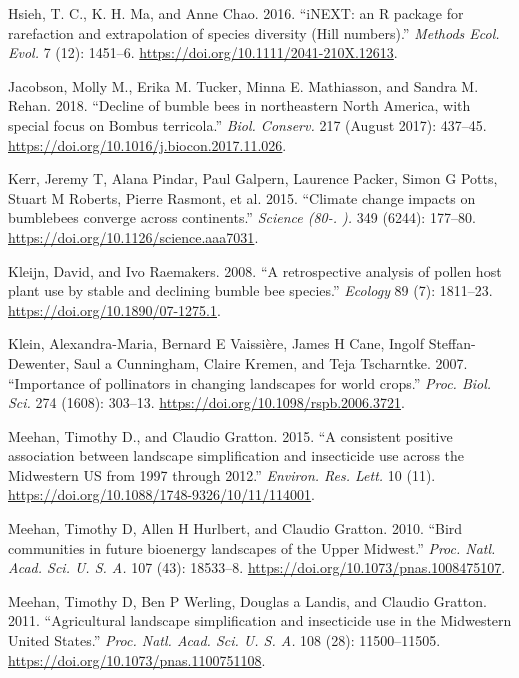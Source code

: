 \documentclass[11pt,]{article}
\begin{document}
\leavevmode\hypertarget{ref-Hsieh2016}{}%
Hsieh, T. C., K. H. Ma, and Anne Chao. 2016. ``iNEXT: an R package for
rarefaction and extrapolation of species diversity (Hill numbers).''
\emph{Methods Ecol. Evol.} 7 (12): 1451--6.
\url{https://doi.org/10.1111/2041-210X.12613}.

\leavevmode\hypertarget{ref-Jacobson2018a}{}%
Jacobson, Molly M., Erika M. Tucker, Minna E. Mathiasson, and Sandra M.
Rehan. 2018. ``Decline of bumble bees in northeastern North America,
with special focus on Bombus terricola.'' \emph{Biol. Conserv.} 217
(August 2017): 437--45.
\url{https://doi.org/10.1016/j.biocon.2017.11.026}.

\leavevmode\hypertarget{ref-Kerr2015}{}%
Kerr, Jeremy T, Alana Pindar, Paul Galpern, Laurence Packer, Simon G
Potts, Stuart M Roberts, Pierre Rasmont, et al. 2015. ``Climate change
impacts on bumblebees converge across continents.'' \emph{Science (80-.
).} 349 (6244): 177--80. \url{https://doi.org/10.1126/science.aaa7031}.

\leavevmode\hypertarget{ref-Kleijn2008}{}%
Kleijn, David, and Ivo Raemakers. 2008. ``A retrospective analysis of
pollen host plant use by stable and declining bumble bee species.''
\emph{Ecology} 89 (7): 1811--23.
\url{https://doi.org/10.1890/07-1275.1}.

\leavevmode\hypertarget{ref-Klein2007g}{}%
Klein, Alexandra-Maria, Bernard E Vaissière, James H Cane, Ingolf
Steffan-Dewenter, Saul a Cunningham, Claire Kremen, and Teja Tscharntke.
2007. ``Importance of pollinators in changing landscapes for world
crops.'' \emph{Proc. Biol. Sci.} 274 (1608): 303--13.
\url{https://doi.org/10.1098/rspb.2006.3721}.

\leavevmode\hypertarget{ref-Meehan2015}{}%
Meehan, Timothy D., and Claudio Gratton. 2015. ``A consistent positive
association between landscape simplification and insecticide use across
the Midwestern US from 1997 through 2012.'' \emph{Environ. Res. Lett.}
10 (11). \url{https://doi.org/10.1088/1748-9326/10/11/114001}.

\leavevmode\hypertarget{ref-Meehan2010a}{}%
Meehan, Timothy D, Allen H Hurlbert, and Claudio Gratton. 2010. ``Bird
communities in future bioenergy landscapes of the Upper Midwest.''
\emph{Proc. Natl. Acad. Sci. U. S. A.} 107 (43): 18533--8.
\url{https://doi.org/10.1073/pnas.1008475107}.

\leavevmode\hypertarget{ref-Meehan2011}{}%
Meehan, Timothy D, Ben P Werling, Douglas a Landis, and Claudio Gratton.
2011. ``Agricultural landscape simplification and insecticide use in the
Midwestern United States.'' \emph{Proc. Natl. Acad. Sci. U. S. A.} 108
(28): 11500--11505. \url{https://doi.org/10.1073/pnas.1100751108}.
\end{document}
